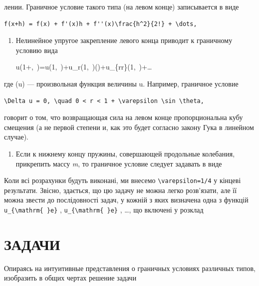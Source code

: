 \documentclass[
  ukrainian,
]{article}
\providecommand{\tightlist}{%
  \setlength{\itemsep}{0pt}\setlength{\parskip}{0pt}}
\begin{document}
лении. Граничное условие такого типа (на левом конце) записывается в
виде

\begin{verbatim}
f(x+h) = f(x) + f'(x)h + f''(x)\frac{h^2}{2!} + \dots,
\end{verbatim}

\begin{enumerate}
\def\labelenumi{\arabic{enumi}.}
\setcounter{enumi}{1}
\item
  Нелинейное упругое закрепление левого конца приводит к граничному
  условию вида

  u(1+\varepsilon\sin\theta,~\theta)=u(1,~\theta)+u\_r(1,~\theta)(\varepsilon\sin\theta)+u\_\{rr\}(1,~\theta)+\ldots
\end{enumerate}

где \varphi(u) --- произвольная функция величины u. Например, граничное
условие

\begin{verbatim}
\Delta u = 0, \quad 0 < r < 1 + \varepsilon \sin \theta,
\end{verbatim}

говорит о том, что возвращающая сила на левом конце пропорциональна кубу
смещения (а не первой степени и, как это будет согласно закону Гука в
линейном случае).

\begin{enumerate}
\def\labelenumi{\arabic{enumi}.}
\setcounter{enumi}{2}
\tightlist
\item
  Если к нижнему концу пружины, совершающей продольные колебания,
  прикрепить массу \emph{m}, то граничное условие следует задавать в
  виде
\end{enumerate}

Коли всі розрахунки будуть виконані, ми внесемо
\texttt{\textbackslash{}varepsilon=1/4} у кінцеві результати. Звісно,
здається, що цю задачу не можна легко розв'язати, але її можна звести до
послідовності задач, у кожній з яких визначена одна з функцій
\texttt{u\_\{\textbackslash{}mathrm\{\ \}e\}} ,
\texttt{u\_\{\textbackslash{}mathrm\{\ \}e\}} , \ldots, що включені у
розклад

\section{ЗАДАЧИ}\label{ux437ux430ux434ux430ux447ux438-5}

Опираясь на интуитивные представления о граничных условиях различных
типов, изобразить в общих чертах решение задачи
\end{document}
